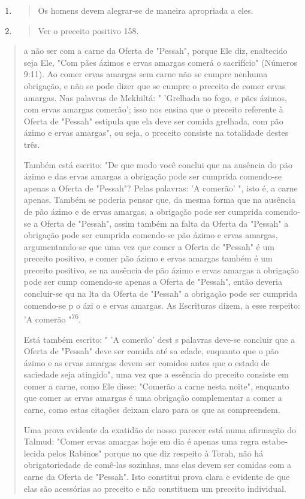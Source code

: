 \begin{enumerate}
\def\labelenumi{\arabic{enumi}.}
\setcounter{enumi}{73}
\item
 \begin{quote}
 Os homens devem alegrar-se de maneira apropriada a eles.
 \end{quote}
\item
 \begin{quote}
 Ver o preceito positivo 158.
 \end{quote}
\end{enumerate}

\begin{quote}a não ser com a carne da Oferta de "Pessah", porque Ele diz, enaltecido
seja Ele, "Com pães ázimos e ervas amargas comerá o sacrifício" (Números
9:11). Ao comer ervas amargas sem carne não se cumpre nenhuma obrigação,
e não se pode dizer que se cumpre o preceito de comer ervas amargas. Nas
palavras de Mekhiltá: " 'Grelhada no fogo, e pães ázimos, com ervas
amargas comerão'; isso nos ensina que o preceito referente à Oferta de
"Pessah" estipula que ela deve ser comida grelhada, com pão ázimo e
ervas amargas", ou seja, o preceito consiste na totalidade destes três.

Também está escrito: "De que modo você conclui que na ausência do pão
ázimo e das ervas amargas a obrigação pode ser cumprida comendo-se
apenas a Oferta de "Pessah"? Pelas palavras: 'A comerão' ", isto é, a
carne ape­nas. Também se poderia pensar que, da mesma forma que na
ausência de pão ázimo e de ervas amargas, a obrigação pode ser cumprida
comendo-se a Oferta de "Pessah", assim também na falta da Oferta da
"Pessah" a obrigação pode ser cumprida comendo-se pão ázimo e ervas
amargas, argumentando-se que uma vez que comer a Oferta de "Pessah" é um
preceito positivo, e comer pão ázi­mo e ervas amargas também é um
preceito positivo, se na ausência de pão ázi­mo e ervas amargas a
obrigação pode ser cump comendo-se apenas a Ofer­ta de "Pessah", então
deveria concluir-se qu na lta da Oferta de "Pessah" a obrigação pode ser
cumprida comendo-se p o ázi o e ervas amargas. As Es­crituras dizem, a
esse respeito: 'A comerão "\textsuperscript{76}.

Está também escrito: " 'A comerão' dest s palavras deve-se concluir que
a Oferta de "Pessah" deve ser comida até sa edade, enquanto que o pão
ázimo e as ervas amargas devem ser comidos antes que o estado de
saciedade seja atingido", uma vez que a essência do preceito consiste em
comer a carne, como Ele disse: "Comerão a carne nesta noite", enquanto
que comer as ervas amargas é uma obrigação complementar a comer a carne,
como estas citações deixam claro para os que as compreendem.

Uma prova evidente da exatidão de nosso parecer está numa afirma­ção do
Talmud: "Comer ervas amargas hoje em dia é apenas uma regra
estabe­lecida pelos Rabinos" porque no que diz respeito à Torah, não há
obrigatorie­dade de comê-las sozinhas, mas elas devem ser comidas com a
carne da Oferta de "Pessah". Isto constitui prova clara e evidente de
que elas são acessórias ao preceito e não constituem um preceito
individual.
\end{quote}

